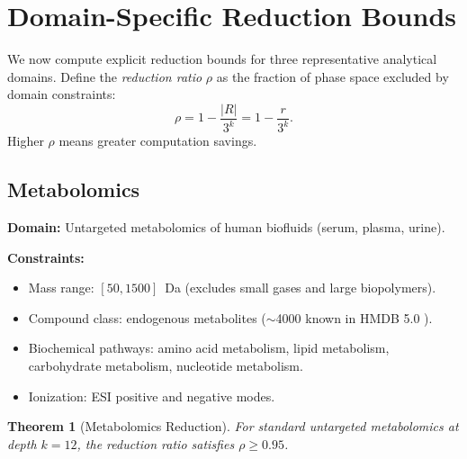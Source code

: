 \documentclass[11pt,twocolumn,a4paper]{article}
\newtheorem{theorem}{Theorem}[section]
\theoremstyle{definition}
\theoremstyle{remark}
\begin{document}
\section{Domain-Specific Reduction Bounds}\label{sec:domain-bounds}

We now compute explicit reduction bounds for three representative analytical domains. Define the \emph{reduction ratio} $\rho$ as the fraction of phase space excluded by domain constraints:
\begin{equation}\label{eq:rho}
  \rho = 1 - \frac{|R|}{3^k} = 1 - \frac{r}{3^k}.
\end{equation}
Higher $\rho$ means greater computation savings.

\subsection{Metabolomics}\label{sec:metabolomics-bounds}

\textbf{Domain:} Untargeted metabolomics of human biofluids (serum, plasma, urine).

\textbf{Constraints:}
\begin{itemize}
  \item Mass range: $[50, 1500]$~Da (excludes small gases and large biopolymers).
  \item Compound class: endogenous metabolites ($\sim$4000 known in HMDB 5.0 \citep{wishart2022}).
  \item Biochemical pathways: amino acid metabolism, lipid metabolism, carbohydrate metabolism, nucleotide metabolism.
  \item Ionization: ESI positive and negative modes.
\end{itemize}

\begin{theorem}[Metabolomics Reduction]\label{thm:metab-reduction}
For standard untargeted metabolomics at depth $k = 12$, the reduction ratio satisfies $\rho \geq 0.95$.
\end{theorem}
\end{document}
